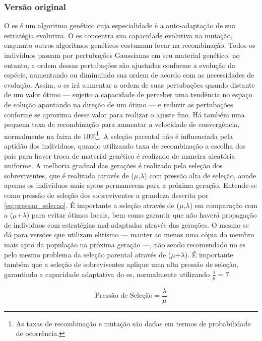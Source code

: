\subsubsection{Versão original}

O \acs{es} é um algoritmo genético cuja especialidade é a
auto-adaptação de sua estratégia evolutiva. O \acs{es} concentra sua
capacidade evolutiva na mutação, enquanto outros algoritmos genéticos
costumam focar na recombinação. Todos os individuos passam por
pertubações Gaussianas em seu material genético, no entanto, a ordem
dessas pertubações são ajustadas conforme a evolução da espécie,
aumentando ou diminuindo sua ordem de acordo com as necessidades de
evolução. Assim, o \acs{es} irá aumentar a ordem de suas pertubações
quando distante de um valor ótimo --- sujeito a capacidade de perceber
uma tendência no espaço de solução apontando na direção de um ótimo
--- e reduzir as pertubações conforme se aproxima desse valor para
realizar o ajuste fino. Há também uma pequena taxa de recombinação
para aumentar a velocidade de convergência, normalmente na faixa de
10\%\footnote{As taxas de recombinação e mutação são dadas em termos
de probabilidade de ocorrência.}. A seleção parental não é influenciada pela aptidão
dos individuos, quando utilizando taxa de recombinação a escolha dos
pais para haver troca de material genético é realizado de maneira
aleatória uniforme. A melhoria gradual das gerações é realizado pela
seleção dos sobreviventes, que é realizada através de
($\mu$,$\lambda$) com pressão alta de seleção, aonde apenas os
indivíduos mais aptos permanecem para a próxima geração. Entende-se como pressão
de seleção dos sobreviventes a grandeza descrita por
\ref{eq:pressao_selecao}. É importante a seleção
através de ($\mu$,$\lambda$) em comparação com a ($\mu$+$\lambda$)
para evitar ótimos locais, bem como garantir que não haverá propagação
de individuos com estratégias mal-adaptadas através das gerações. O
mesmo se dá para versões que utilizam elitismo --- manter ao menos uma
cópia do membro mais apto da população na próxima geração ---, não
sendo recomendado no \acs{es} pelo mesmo problema da seleção parental
através de ($\mu$+$\lambda$). É importante também que a seleção de
sobreviventes aplique uma alta pressão de seleção, garantindo a
capacidade adaptativa do \acs{es}, normalmente utilizando
$\frac{\lambda}{\mu}=7$.

\begin{equation}\label{eq:pressao_selecao}
\text{Pressão de Seleção} = \dfrac{\lambda}{\mu}
\end{equation}

